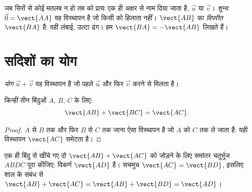 \begin{notation}
जब सिरों से कोई मतलब न हो तब  को प्रायः एक ही अक्षर से नाम दिया जाता है,
$\vec u$ या $\vec v$। \emph{शून्य } $\vec 0 = \vect{AA}$ वह विस्थापन है जो किसी को हिलाता नहीं।
$\vect{AB}$ का \emph{विपरीत} $\vect{BA}$ है: वही लंबाई, उल्टा ढंग। हम $\vect{BA} = -\vect{AB}$ लिखते हैं।
\end{notation}

\section{सदिशों का योग}

\begin{definition}[दो सदिशों का योग]\label{def:g10:vectors:sum}
\emph{योग} $\vec u + \vec v$ वह विस्थापन है जो पहले $\vec u$ और फिर $\vec v$
करने से मिलता है।
\end{definition}

\begin{theorem}[शाल का संबंध]\label{thm:g10:vectors:chasles}
किन्हीं तीन बिंदुओं $A$, $B$, $C$ के लिए:
\[
\vect{AB} + \vect{BC} = \vect{AC}.
\]
\end{theorem}

\begin{proof}
$A$ से $B$ तक और फिर $B$ से $C$ तक जाना ऐसा विस्थापन है जो $A$ को $C$
तक ले जाता है: यही विस्थापन $\vect{AC}$ समेटता है।
\end{proof}

\begin{remark}[समांतर चतुर्भुज नियम]
एक ही बिंदु से खींचे गए दो  $\vect{AB} + \vect{AC}$ को जोड़ने के लिए समांतर चतुर्भुज $ABDC$
पूरा कीजिए:  विकर्ण $\vect{AD}$ है। सचमुच $\vect{AC} = \vect{BD}$, इसलिए शाल के संबंध से $\vect{AB} + \vect{AC} = \vect{AB} + \vect{BD} = \vect{AD}$।
\end{remark}


